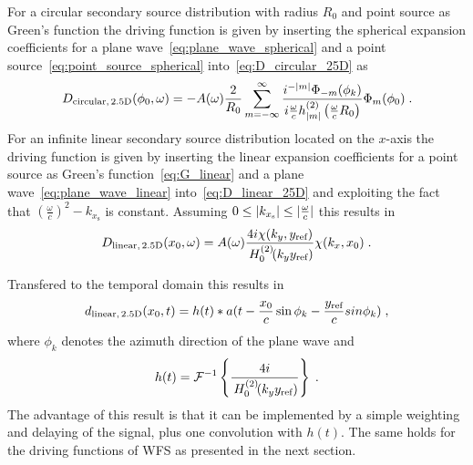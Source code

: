 For a circular secondary source distribution with radius $R_0$ and point source
as Green's function the \twohalfD driving function is given by inserting the
spherical expansion coefficients for a plane wave~\eqref{eq:plane_wave_spherical}
and a point source~\eqref{eq:point_source_spherical} into~\eqref{eq:D_circular_25D} as
%
\begin{equation}
    D_{\text{circular},\,\twohalfD}(\phi_0,\omega) = -A(\omega) \frac{2}{R_0}
    \sum_{m=-\infty}^\infty \frac{i^{-|m|} \Phi_{-m}(\phi_k)} {i\omegac
    h_{|m|}^{(2)}\left(\omegac R_0\right)} \Phi_m(\phi_0) \qp
    \label{eq:D_nfchoa_pw_25D}
\end{equation}
%
For an infinite linear secondary source distribution located on the $x$-axis the
\twohalfD driving function is given by inserting the linear expansion coefficients
for a point source as Green's function~\eqref{eq:G_linear} and
a plane wave~\eqref{eq:plane_wave_linear} into~\eqref{eq:D_linear_25D} and
exploiting the fact that $(\frac{\omega}{c})^2 - k_{x_\text{s}}$ is constant. Assuming
$0 \le |k_{x_\text{s}}| \le |\frac{\omega}{c}|$ this results
in
%
\begin{equation}
    D_{\text{linear},\,\twohalfD}(x_0,\omega) = A(\omega) \frac{4i
    \chi(k_y,y_\text{ref})}
    {\H{0}{2}(k_y y_\text{ref})} \chi(k_x,x_0) \qp
    \label{eq:D_sdm_pw_25D}
\end{equation}
%

Transfered to the temporal domain this results
in
%
\begin{equation}
    d_{\text{linear},\,\twohalfD}(x_0,t) = h(t) *
    a(t-\frac{x_0}{c}\sin\phi_k-\frac{y_\text{ref}}{c}sin\phi_k)
    \qc
    \label{eq:d_sdm_pw_25D}
\end{equation}
%
where $\phi_k$ denotes the azimuth direction of the plane wave and
\begin{equation}
h(t) =
 \mathcal{F}^{-1}\left\{\frac{4i}{\,H_{0}^{(2)}\!(k_y y_\text{ref})}\right\} \;.
\end{equation}
The advantage of this
result is that it can be implemented by a simple weighting and delaying of
the signal, plus one convolution with $h(t)$. The same holds for the driving
functions of \ac{WFS} as presented in the next section.


